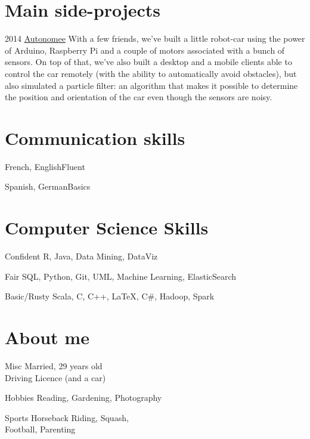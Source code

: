\documentclass{tccv}
\begin{document}
\section{Main side-projects}

\begin{yearlist}

\item{2014}
     {\href{https://github.com/halflings/autonomee}{Autonomee}}
     {With a few friends, we've built a little robot-car using the power of Arduino, Raspberry Pi and a couple of motors associated with a bunch of sensors. On top of that, we've also built a desktop and a mobile clients able to control the car remotely (with the ability to automatically avoid obstacles), but also simulated a particle filter: an algorithm that makes it possible to determine the position and orientation of the car even though the sensors are noisy.}

\end{yearlist}

\section{Communication skills}

\begin{factlist}
\item{French, English}{Fluent}
\item{Spanish, German}{Basics}
\end{factlist}

\section{Computer Science Skills}

\begin{factlist}

\item{Confident}
     {R, Java, Data Mining, DataViz}

\item{Fair}
     {SQL, Python, Git, UML, Machine Learning, ElasticSearch}

\item{Basic/Rusty}
     {Scala, C, C++, \LaTeX, C\#, Hadoop, Spark}

\end{factlist}

\section{About me}

\begin{factlist}

\item{Misc}
     {Married, 29 years old\\Driving Licence (and a car)\\}

\item{Hobbies}
     {Reading, Gardening, Photography}

\item{Sports}
     {Horseback Riding, Squash,\\Football, Parenting}

\end{factlist}
\end{document}
